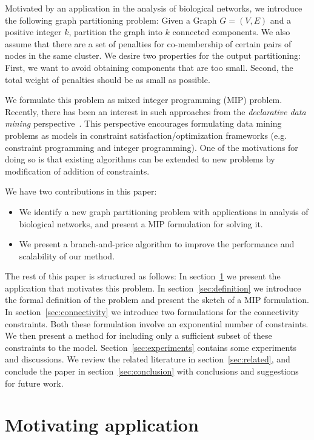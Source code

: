 \documentclass[conference,compsoc]{IEEEtran}
\begin{document}
Motivated by an application in the analysis of biological networks, we
introduce the following graph partitioning problem: Given a Graph
$G=(V, E)$ and a positive integer $k$, partition the graph into $k$
connected components. We also assume that there are a set of penalties
for co-membership of certain pairs of nodes in the same cluster. We
desire two properties for the output partitioning: First, we want to
avoid obtaining components that are too small. Second, the total
weight of penalties should be as small as possible.

We formulate this problem as mixed integer programming (MIP)
problem. Recently, there has been an interest in such
approaches from the \emph{declarative data mining}
perspective~\cite{vran,me}. This perspective encourages formulating
data mining problems as models in constraint satisfaction/optimization
frameworks (e.g. constraint programming and integer programming). One
of the motivations for doing so is that existing algorithms can be
extended to new problems by modification of addition of constraints.

We have two contributions in this paper:
\begin{itemize}
\item We identify a new graph partitioning problem with applications in analysis of biological networks, and present a MIP formulation for solving it. 
\item We present a branch-and-price algorithm to improve the performance and scalability of our method. 
\end{itemize}

The rest of this paper is structured as follows:  In
section~\ref{sec:motivation} we present the application that motivates
this problem.  In section~\ref{sec:definition} we introduce the formal
definition of the problem and present the sketch of a MIP formulation.
In section~\ref{sec:connectivity} we introduce two formulations for
the connectivity constraints. Both these formulation involve an
exponential number of constraints. We then present a method for
including only a sufficient subset of these constraints to the
model. Section~\ref{sec:experiments} contains some experiments and
discussions. We review the related literature in section~\ref{sec:related}, and conclude the paper in section~\ref{sec:conclusion} with conclusions and suggestions for future work.


\section{Motivating application}
\label{sec:motivation}
\end{document}
